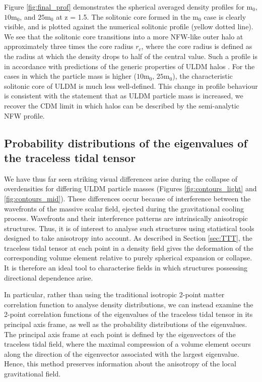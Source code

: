 \documentclass[a4paper,11pt]{article}
\begin{document}
Figure \ref{fig:final_prof} demonstrates the spherical averaged density profiles for $\mathrm{m}_0$, $\mathrm{10m}_0$, and $\mathrm{25m}_0$ at z = 1.5. The solitonic core formed in the $\mathrm{m}_0$ case is clearly visible, and is plotted against the numerical solitonic profile (yellow dotted line). We see that the solitonic core transitions into a more NFW-like outer halo at approximately three times the core radius $r_c$, where the core radius is defined as the radius at which the density drops to half of the central value. Such a profile is in accordance with predictions of the generic properties of ULDM halos \cite{Veltmaat:2018dfz, Lin:2018whl, Chavanis:2018pkx}. For the cases in which the particle mass is higher ($\mathrm{10m}_0$, $\mathrm{25m}_0$), the characteristic solitonic core of ULDM is much less well-defined. This change in profile behaviour is consistent with the statement that as ULDM particle mass is increased, we recover the CDM limit in which halos can be described by the semi-analytic NFW profile. 




\subsection{Probability distributions of the eigenvalues of the traceless tidal tensor}\label{sec:probs}

We have thus far seen striking visual differences arise during the collapse of overdensities for differing ULDM particle masses (Figures \ref{fig:contours_light} and \ref{fig:contours_mid}). These differences occur because of interference between the wavefronts of the massive scalar field, ejected during the gravitational cooling process. Wavefronts and their interference patterns are intrinsically anisotropic structures. Thus, it is of interest to analyse such structures using statistical tools designed to take anisotropy into account. As described in Section \ref{sec:TTT}, the traceless tidal tensor at each point in a density field gives the deformation of the corresponding volume element relative to purely spherical expansion or collapse. It is therefore an ideal tool to characterise fields in which structures possessing directional dependence arise. 

In particular, rather than using the traditional isotropic 2-point matter correlation function to analyse density distributions, we can instead examine the 2-point correlation functions of the eigenvalues of the traceless tidal tensor in its principal axis frame, as well as the probability distributions of the eigenvalues. The principal axis frame at each point is defined by the eigenvectors of the traceless tidal field, where the maximal compression of a volume element occurs along the direction of the eigenvector associated with the largest eigenvalue. Hence, this method preserves information about the anisotropy of the local gravitational field. 
\end{document}
